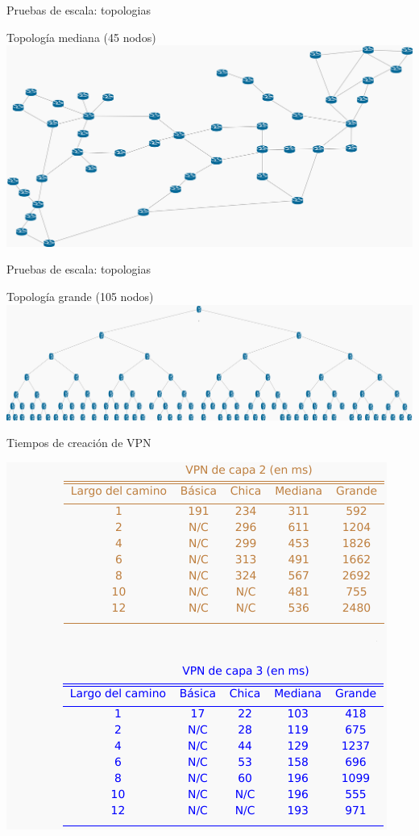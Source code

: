 \documentclass[xcolor=svgnames]{beamer}
\begin{document}
\begin{frame}{Pruebas de escala: topologias}
	\begin{center}
		Topología mediana (45 nodos)
		\includegraphics[scale=0.15]{medium_topology}
	\end{center}
\end{frame}

\begin{frame}{Pruebas de escala: topologias}
	\begin{center}
		Topología grande (105 nodos)
		\includegraphics[scale=0.09]{large_topology}
	\end{center}
\end{frame}

\begin{frame}{Tiempos de creación de VPN}
	\begin{center}
		\includegraphics[height=0.9\textheight]{tiempos_vpn}
	\end{center}
\end{frame}
\end{document}
